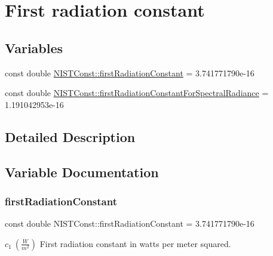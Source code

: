 \hypertarget{group___n_i_s_t_const-_first_radiation_constant}{}\section{First radiation constant}
\label{group___n_i_s_t_const-_first_radiation_constant}
\subsection*{Variables}
\begin{DoxyCompactItemize}
\item 
const double \mbox{\hyperlink{group___n_i_s_t_const-_first_radiation_constant_ga59a54a84c539969a14695bd822b116cb}{N\+I\+S\+T\+Const\+::first\+Radiation\+Constant}} = 3.\+741771790e-\/16
\item 
const double \mbox{\hyperlink{group___n_i_s_t_const-_first_radiation_constant_ga877c0bc2579b88ae515b80aeb58aa68e}{N\+I\+S\+T\+Const\+::first\+Radiation\+Constant\+For\+Spectral\+Radiance}} = 1.\+191042953e-\/16
\end{DoxyCompactItemize}


\subsection{Detailed Description}


\subsection{Variable Documentation}
\mbox{\label{group___n_i_s_t_const-_first_radiation_constant_ga59a54a84c539969a14695bd822b116cb}} 
\subsubsection{\texorpdfstring{first\+Radiation\+Constant}{firstRadiationConstant}}
{\footnotesize\ttfamily const double N\+I\+S\+T\+Const\+::first\+Radiation\+Constant = 3.\+741771790e-\/16}

$c_1 \ (\frac{W}{m^2})$ First radiation constant in watts per meter squared. \mbox{\label{group___n_i_s_t_const-_first_radiation_constant_ga877c0bc2579b88ae515b80aeb58aa68e}} 
